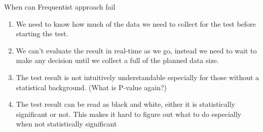 \documentclass{beamer}
\begin{document}
\begin{frame}{When can Frequentist approach fail}
	\begin{enumerate}
		\item We need to know how much of the data we need to collect for the test before starting the test.
		\item We can’t evaluate the result in real-time as we go, instead we need to wait to make any decision until we collect a full of the planned data size.
		\item The test result is not intuitively understandable especially for those without a statistical background. (What is P-value again?)
		\item The test result can be read as black and white, either it is statistically significant or not. This makes it hard to figure out what to do especially when not statistically significant
	\end{enumerate}
\end{frame}
\end{document}
